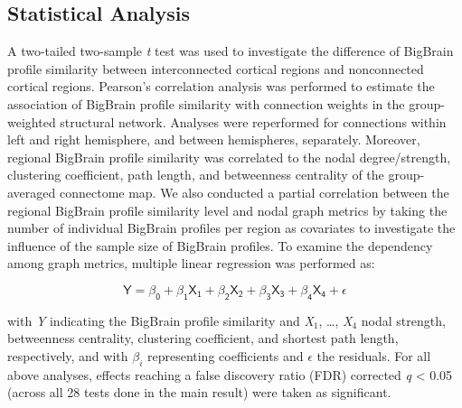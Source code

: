 \begin{refsection}
\subsection*{Statistical Analysis}
A two-tailed two-sample \textit{t} test was used to investigate the difference of BigBrain profile similarity between interconnected cortical regions and nonconnected cortical regions. Pearson’s correlation analysis was performed to estimate the association of BigBrain profile similarity with connection weights in the group-weighted structural network. Analyses were reperformed for connections within left and right hemisphere, and between hemispheres, separately. Moreover, regional BigBrain profile similarity was correlated to the nodal degree/strength, clustering coefficient, path length, and betweenness centrality of the group-averaged connectome map. We also conducted a partial correlation between the regional BigBrain profile similarity level and nodal graph metrics by taking the number of individual BigBrain profiles per region as covariates to investigate the influence of the sample size of BigBrain profiles. To examine the dependency among graph metrics, multiple linear regression was performed as:

\[\mathsf{Y=\beta_0+\beta_1X_1+\beta_2X_2+\beta_3X_3+\beta_4X_4+\epsilon}\]

with \textit{Y} indicating the BigBrain profile similarity and \textit{X}$_1$, …, \textit{X}$_4$ nodal strength, betweenness centrality, clustering coefficient, and shortest path length, respectively, and with $\beta_i$ representing coefficients and $\epsilon$ the residuals. For all above analyses, effects reaching a false discovery ratio (FDR) corrected \textit{q} < 0.05 (across all 28 tests done in the main result) were taken as significant.


\end{refsection}
